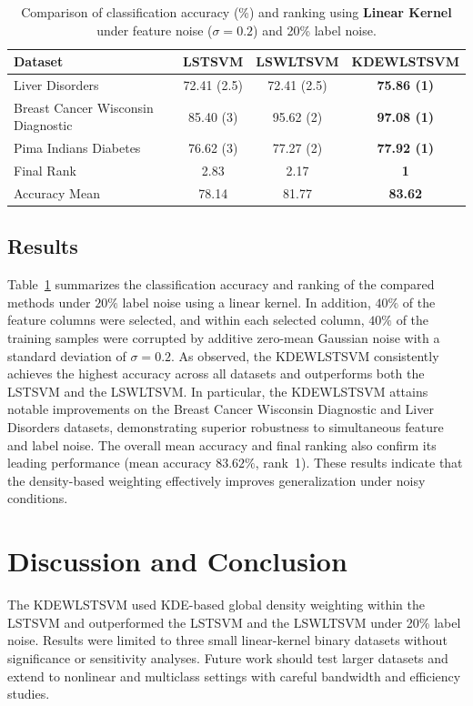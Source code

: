 \documentclass[twoside]{article}
\begin{document}
\begin{table}[htbp]
\footnotesize
\centering
\caption{Comparison of classification accuracy (\%) and ranking using \textbf{Linear Kernel} under feature noise ($\sigma=0.2$) and 20\% label noise.}
\label{tab:results_linear20}
\begin{tabular}{lccc}
\hline
\textbf{Dataset} & \textbf{LSTSVM} & \textbf{LSWLTSVM} & \textbf{KDEWLSTSVM} \\
\hline
Liver Disorders
& 72.41 (2.5)
& 72.41 (2.5)
& \textbf{75.86 (1)} \\
Breast Cancer Wisconsin Diagnostic
& 85.40 (3)
& 95.62 (2)
& \textbf{97.08 (1)} \\
Pima Indians Diabetes
& 76.62 (3)
& 77.27 (2)
& \textbf{77.92 (1)} \\
\hline
Final Rank
& 2.83
& 2.17
& \textbf{1} \\
\hline
Accuracy Mean
& 78.14
& 81.77
& \textbf{83.62} \\
\hline
\end{tabular}
\end{table}
\subsection{Results}
Table~\ref{tab:results_linear20} summarizes the classification accuracy and ranking of the compared methods under $20\%$ label noise using a linear kernel. In addition, $40\%$ of the feature columns were selected, and within each selected column, $40\%$ of the training samples were corrupted by additive zero-mean Gaussian noise with a standard deviation of $\sigma = 0.2$. As observed, the KDEWLSTSVM consistently achieves the highest accuracy across all datasets and outperforms both the LSTSVM and the LSWLTSVM. In particular, the KDEWLSTSVM attains notable improvements on the Breast Cancer Wisconsin Diagnostic and Liver Disorders datasets, demonstrating superior robustness to simultaneous feature and label noise. The overall mean accuracy and final ranking also confirm its leading performance (mean accuracy $83.62\%$, rank~1). These results indicate that the density-based weighting effectively improves generalization under noisy conditions.
\section*{Discussion and Conclusion}
The KDEWLSTSVM used KDE-based global density weighting within the LSTSVM and outperformed the LSTSVM and the LSWLTSVM under 20\% label noise. Results were limited to three small linear-kernel binary datasets without significance or sensitivity analyses. Future work should test larger datasets and extend to nonlinear and multiclass settings with careful bandwidth and efficiency studies.
\end{document}
